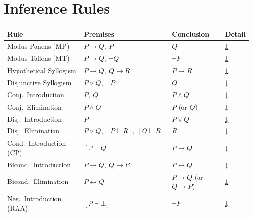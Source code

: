 
\section{Inference Rules}

\begin{tcolorbox}[colback=gray!6, colframe=gray!40, arc=2pt,
  left=6pt, right=6pt, top=4pt, bottom=4pt,
  title={\small\textbf{Inference Rules — Quick Reference}},
  fonttitle=\small\bfseries]
\small
\begin{tabular}{l l l l}
\toprule
\textbf{Rule} & \textbf{Premises} & \textbf{Conclusion} & \textbf{Detail} \\
\midrule
Modus Ponens (MP)         & $P\to Q,\; P$              & $Q$                & \hyperref[def:mp]{↓} \\
Modus Tollens (MT)        & $P\to Q,\; \neg Q$         & $\neg P$           & \hyperref[def:mt]{↓} \\
Hypothetical Syllogism    & $P\to Q,\; Q\to R$         & $P\to R$           & \hyperref[def:hs]{↓} \\
Disjunctive Syllogism     & $P\vee Q,\; \neg P$        & $Q$                & \hyperref[def:ds]{↓} \\
Conj.\ Introduction       & $P,\; Q$                   & $P\wedge Q$        & \hyperref[def:conj-i]{↓} \\
Conj.\ Elimination        & $P\wedge Q$                & $P$ (or $Q$)       & \hyperref[def:conj-e]{↓} \\
Disj.\ Introduction       & $P$                        & $P\vee Q$          & \hyperref[def:disj-i]{↓} \\
Disj.\ Elimination        & $P\vee Q,\;[P\vdash R],\;[Q\vdash R]$ & $R$  & \hyperref[def:disj-e]{↓} \\
Cond.\ Introduction (CP)  & $[P \vdash Q]$             & $P\to Q$           & \hyperref[def:cond-i]{↓} \\
Bicond.\ Introduction     & $P\to Q,\; Q\to P$         & $P\leftrightarrow Q$ & \hyperref[def:bicond-i]{↓} \\
Bicond.\ Elimination      & $P\leftrightarrow Q$       & $P\to Q$ (or $Q\to P$) & \hyperref[def:bicond-e]{↓} \\
Neg.\ Introduction (RAA)  & $[P\vdash\bot]$            & $\neg P$           & \hyperref[def:neg-i]{↓} \\

\end{tabular}
\end{tcolorbox}
